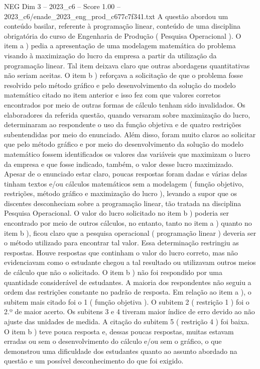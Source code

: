 \begin{textsample}{NEG Dim 3 – 2023\_c6 – Score 1.00 – 2023\_c6/enade\_2023\_eng\_prod\_c677c7f341.txt}
A questão abordou um conteúdo basilar, referente à programação linear, conteúdo de uma disciplina obrigatória do curso de Engenharia de Produção ( Pesquisa Operacional ).
O item a ) pedia a apresentação de uma modelagem matemática do problema visando à maximização do lucro da empresa a partir da utilização da programação linear.
Tal item deixava claro que outras abordagens quantitativas não seriam aceitas.
O item b ) reforçava a solicitação de que o problema fosse resolvido pelo método gráfico e pelo desenvolvimento da solução do modelo matemático citado no item anterior e isso fez com que valores corretos encontrados por meio de outras formas de cálculo tenham sido invalidados.
Os elaboradores da referida questão, quando versaram sobre maximização do lucro, determinaram ao respondente o uso da função objetiva e de quatro restrições subentendidas por meio do enunciado.
Além disso, foram muito claros ao solicitar que pelo método gráfico e por meio do desenvolvimento da solução do modelo matemático fossem identificados os valores das variáveis que maximizam o lucro da empresa e que fosse indicado, também, o valor desse lucro maximizado.
Apesar de o enunciado estar claro, poucas respostas foram dadas e várias delas tinham textos e/ou cálculos matemáticos sem a modelagem ( função objetivo, restrições, método gráfico e maximização do lucro ), levando a supor que os discentes desconheciam sobre a programação linear, tão tratada na disciplina Pesquisa Operacional.
O valor do lucro solicitado no item b ) poderia ser encontrado por meio de outros cálculos, no entanto, tanto no item a ) quanto no item b ), ficou claro que a pesquisa operacional ( programação linear ) deveria ser o método utilizado para encontrar tal valor.
Essa determinação restringiu as respostas.
Houve respostas que continham o valor do lucro correto, mas não evidenciavam como o estudante chegou a tal resultado ou utilizavam outros meios de cálculo que não o solicitado.
O item b ) não foi respondido por uma quantidade considerável de estudantes.
A maioria dos respondentes não seguiu a ordem das restrições constante no padrão de resposta.
Em relação ao item a ), o subitem mais citado foi o 1 ( função objetiva ).
O subitem 2 ( restrição 1 ) foi o 2.º de maior acerto.
Os subitens 3 e 4 tiveram maior índice de erro devido ao não ajuste das unidades de medida.
A citação do subitem 5 ( restrição 4 ) foi baixa.
O item b ) teve pouca resposta e, dessas poucas respostas, muitas estavam erradas ou sem o desenvolvimento do cálculo e/ou sem o gráfico, o que demonstrou uma dificuldade dos estudantes quanto ao assunto abordado na questão e um possível desconhecimento do que foi exigido.

\end{textsample}
